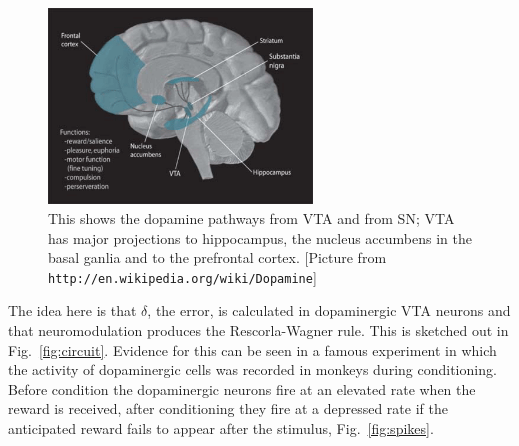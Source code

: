 \documentclass[11pt,a4paper]{scrartcl}
\begin{document}
\begin{figure}
\begin{center}
\includegraphics[width=7cm]{Dopamine_Pathways.png}
\end{center}
\caption{This shows the dopamine pathways from VTA and from SN; VTA
  has major projections to hippocampus, the nucleus accumbens in the
  basal ganlia and to the prefrontal cortex. [Picture from
    \texttt{http://en.wikipedia.org/wiki/Dopamine}]\label{fig:VTA}}
\end{figure}

The idea here is that $\delta$, the error, is calculated in
dopaminergic VTA neurons and that neuromodulation produces the
Rescorla-Wagner rule. This is sketched out in
Fig.~\ref{fig:circuit}. Evidence for this can be seen in a famous
experiment \cite{SchultzDayanMontague1997a} in which the activity of
dopaminergic cells was recorded in monkeys during conditioning. Before
condition the dopaminergic neurons fire at an elevated rate when the
reward is received, after conditioning they fire at a depressed rate
if the anticipated reward fails to appear after the stimulus, Fig.~\ref{fig:spikes}.
\end{document}
